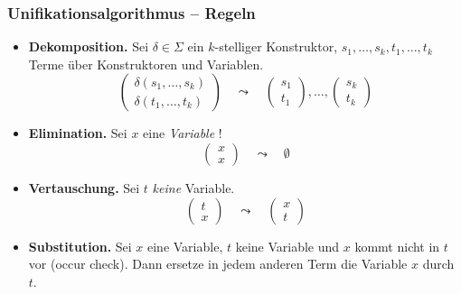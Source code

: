 \documentclass{beamer}
\begin{document}
\begin{frame}\frametitle{Unifikationsalgorithmus -- Regeln}
	\small
	\begin{itemize}
		\item \textbf{Dekomposition.} Sei $\delta \in \Sigma$ ein $k$-stelliger Konstruktor, $s_1 , \dots , s_k , t_1 , \dots , t_k$ Terme über Konstruktoren und Variablen.
		\begin{equation*}
			\begin{pmatrix}
				\delta(s_1, \dots , s_k) \\ \delta(t_1, \dots , t_k)
			\end{pmatrix}
			\quad \leadsto \quad
			\begin{pmatrix} s_1 \\ t_1 \end{pmatrix} , \dots , \begin{pmatrix} s_k \\ t_k \end{pmatrix}
		\end{equation*}
		\item \textbf{Elimination.} Sei $x$ eine \textit{Variable} !
		\begin{equation*}
			\begin{pmatrix} x \\ x \end{pmatrix}
			\quad \leadsto \quad
			\emptyset
		\end{equation*}
		\item \textbf{Vertauschung.} Sei $t$ \textit{keine} Variable.
		\begin{equation*}
			\begin{pmatrix} t \\ x \end{pmatrix}
			\quad \leadsto \quad 
			\begin{pmatrix} x \\ t \end{pmatrix}
		\end{equation*}
		\item \textbf{Substitution.} Sei $x$ eine Variable, $t$ keine Variable und $x$ kommt nicht in $t$ vor (occur check). Dann ersetze in jedem anderen Term die Variable $x$ durch $t$.
	\end{itemize}
\end{frame}
\end{document}
